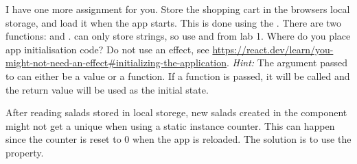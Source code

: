 \documentclass[fleqn, article, a4paper]{memoir}
\begin{document}
\begin{Assignments}
\item I have one more assignment for you. Store the shopping cart in the browsers local storage, and load it when the app starts. This is done using the . There are two functions:  and .  can only store strings, so use  and  from lab 1. Where do you place app initialisation code? Do not use an effect, see \url{https://react.dev/learn/you-might-not-need-an-effect#initializing-the-application}. \emph{Hint: } The argument passed to  can either be a value or a function. If a function is passed, it will be called and the return value will be used as the initial state.

After reading salads stored in local storege, new salads created in the  component might not get a unique  when using a static instance counter. This can happen since the counter is reset to 0 when the app is reloaded. The solution is to use the  property.
\end{Assignments}

\end{document}

